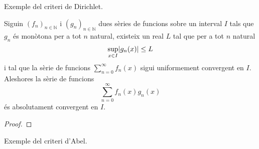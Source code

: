 \documentclass[../Apunts.tex]{subfiles}
\begin{document}
	\begin{example}
		Exemple del criteri de Dirichlet.
		\begin{solution}
		\end{solution}
	\end{example}
	\begin{theorem}
		\label{thm:criteri d'Abel}
		Siguin \((f_{n})_{n\in\mathbb{N}}\) i \((g_{n})_{n\in\mathbb{N}}\) dues sèries de funcions sobre un interval \(I\) tals que \(g_{n}\) és monòtona per a tot \(n\) natural, existeix un real \(L\) tal que per a tot \(n\) natural
		\[\sup_{x\in I}\abs{g_{n}(x)}\leq L\]
		i tal que la sèrie de funcions \(\sum_{n=0}^{\infty}f_{n}(x)\) sigui uniformement convergent en \(I\). Aleshores la sèrie de funcions
		\[\sum_{n=0}^{\infty}f_{n}(x)g_{n}(x)\]
		és absolutament convergent en \(I\).
		\begin{proof}
		\end{proof}
	\end{theorem}
	\begin{example}
		Exemple del criteri d'Abel.
		\begin{solution}
		\end{solution}
	\end{example}
\end{document}

